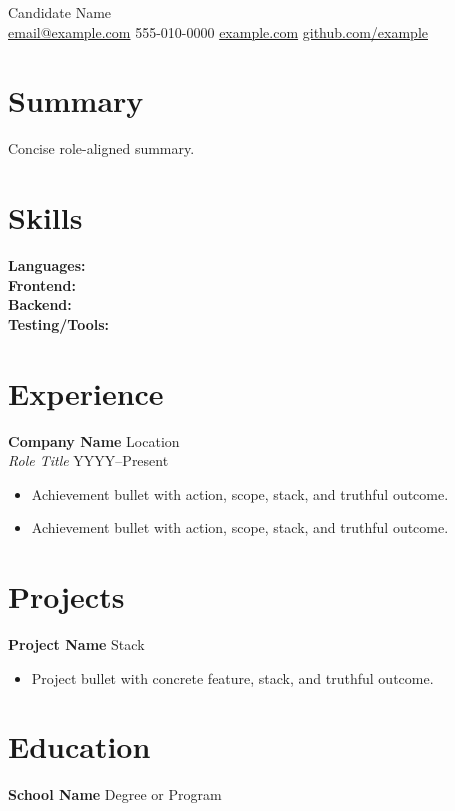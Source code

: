 \documentclass[10pt]{article}
\begin{document}
\begin{center}
{\LARGE Candidate Name}\\
\href{mailto:email@example.com}{email@example.com} \textbar{}
555-010-0000 \textbar{}
\href{https://example.com}{example.com} \textbar{}
\href{https://github.com/example}{github.com/example}
\end{center}

\section*{Summary}
Concise role-aligned summary.

\section*{Skills}
\textbf{Languages:} \\
\textbf{Frontend:} \\
\textbf{Backend:} \\
\textbf{Testing/Tools:}

\section*{Experience}
\textbf{Company Name} \hfill Location \\
\textit{Role Title} \hfill YYYY--Present
\begin{itemize}
  \item Achievement bullet with action, scope, stack, and truthful outcome.
  \item Achievement bullet with action, scope, stack, and truthful outcome.
\end{itemize}

\section*{Projects}
\textbf{Project Name} \hfill Stack
\begin{itemize}
  \item Project bullet with concrete feature, stack, and truthful outcome.
\end{itemize}

\section*{Education}
\textbf{School Name} \hfill Degree or Program
\end{document}

